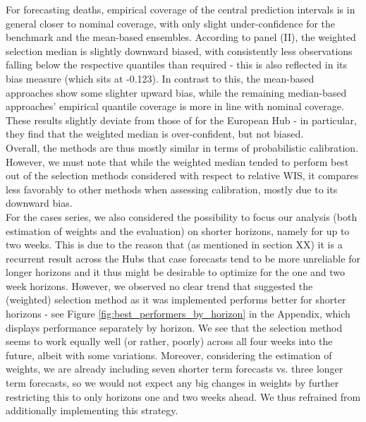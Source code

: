 For forecasting deaths, empirical coverage of the central prediction intervals is in general closer to nominal coverage, with only slight under-confidence for the benchmark and the mean-based ensembles. According to panel (II), the weighted selection median is slightly downward biased, with consistently less observations falling below the respective quantiles than required - this is also reflected in its bias measure (which sits at -0.123). In contrast to this, the mean-based approaches show some slighter upward bias,  while the remaining median-based approaches' empirical quantile coverage is more in line with nominal coverage. These results slightly deviate from those of \cite{ray_comparing_2022} for the European Hub - in particular, they find that the weighted median is over-confident, but not biased. \\ %
Overall, the methods are thus mostly similar in terms of probabilistic calibration. However, we must note that while the weighted median tended to perform best out of the selection methods considered with respect to relative WIS, it compares less favorably to other methods when assessing calibration, mostly due to its downward bias. \medskip \\%
For the cases series, we also considered the possibility to focus our analysis (both estimation of weights and the evaluation) on shorter horizons, namely for up to two weeks. This is due to the reason that (as mentioned in section XX) it is a recurrent result across the Hubs that case forecasts tend to be more unreliable for longer horizons and it thus might be desirable to optimize for the one and two week horizons. However, we observed no clear trend that suggested the (weighted) selection method as it was implemented performs better for shorter horizons - see Figure \ref{fig:best_performers_by_horizon} in the Appendix, which displays performance separately by horizon. We see that the selection method seems to work equally well (or rather, poorly) across all four weeks into the future, albeit with some variations. Moreover, considering the estimation of weights, we are already including seven shorter term forecasts vs. three longer term forecasts, so we would not expect any big changes in weights by further restricting this to only horizons one and two weeks ahead. We thus refrained from additionally implementing this strategy. \medskip \\
